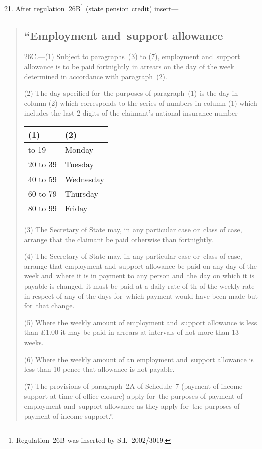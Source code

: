 \documentclass[12pt,a4paper]{article}
\begin{document}
21.  After regulation~26B\footnote{Regulation~26B was inserted by S.I.~2002/3019.} (state pension credit) insert—
\begin{quotation}
\subsection*{“Employment and~support allowance}

26C.---(1)  Subject to paragraphs~(3) to (7), employment and~support allowance is to be paid fortnightly in arrears on the day of the week determined in accordance with paragraph~(2).

(2) The day specified for~the purposes of paragraph~(1) is the day in column (2) which corresponds to the series of numbers in column (1) which includes the last 2 digits of the claimant’s national insurance number—

{\noindent
\begin{longtable}{ll}
\hline
(1)	&(2)\\
\hline
\endhead
\hline
\endlastfoot
00 to 19	&Monday\\
20 to 39	&Tuesday\\
40 to 59	&Wednesday\\
60 to 79	&Thursday\\
80 to 99	&Friday\\
\end{longtable}

}

(3) The Secretary of State may, in any particular case or~class of case, arrange that the claimant be paid otherwise than fortnightly.

(4) The Secretary of State may, in any particular case or~class of case, arrange that employment and~support allowance be paid on any day of the week and~where it is in payment to any person and~the day on which it is payable is changed, it must be paid at a daily rate of th of the weekly rate in respect of any of the days for~which payment would have been made but for~that change.

(5) Where the weekly amount of employment and~support allowance is less than £1$.$00 it may be paid in arrears at intervals of not more than 13 weeks.

(6) Where the weekly amount of an employment and~support allowance is less than 10 pence that allowance is not payable.

(7) The provisions of paragraph~2A of Schedule~7 (payment of income support at time of office closure) apply for~the purposes of payment of employment and~support allowance as they apply for~the purposes of payment of income support.”.
\end{quotation}
\end{document}
